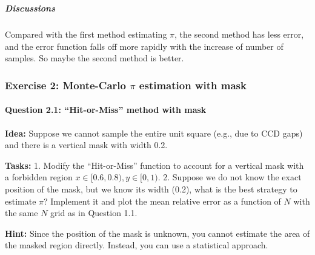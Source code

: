\documentclass[11pt]{article}
\begin{document}
    \begin{center}
    \end{center}
    { \hspace*{\fill} \\}
    
    \subparagraph{Discussions}\label{discussions}

Compared with the first method estimating \(\pi\), the second method has
less error, and the error function falls off more rapidly with the
increase of number of samples. So maybe the second method is better.

    \subsubsection{\texorpdfstring{Exercise 2: Monte-Carlo \(\pi\)
estimation with
mask}{Exercise 2: Monte-Carlo \textbackslash pi estimation with mask}}\label{exercise-2-monte-carlo-pi-estimation-with-mask}

\paragraph{Question 2.1: ``Hit-or-Miss'' method with
mask}\label{question-2.1-hit-or-miss-method-with-mask}

\textbf{Idea:} Suppose we cannot sample the entire unit square (e.g.,
due to CCD gaps) and there is a vertical mask with width 0.2.

\textbf{Tasks:} 1. Modify the ``Hit-or-Miss'' function to account for a
vertical mask with a forbidden region
\(x \in [0.6, 0.8), y \in [0, 1)\). 2. Suppose we do not know the exact
position of the mask, but we know its width (0.2), what is the best
strategy to estimate \(\pi\)? Implement it and plot the mean relative
error as a function of \(N\) with the same \(N\) grid as in Question
1.1.

\textbf{Hint:} Since the position of the mask is unknown, you cannot
estimate the area of the masked region directly. Instead, you can use a
statistical approach.
\end{document}
